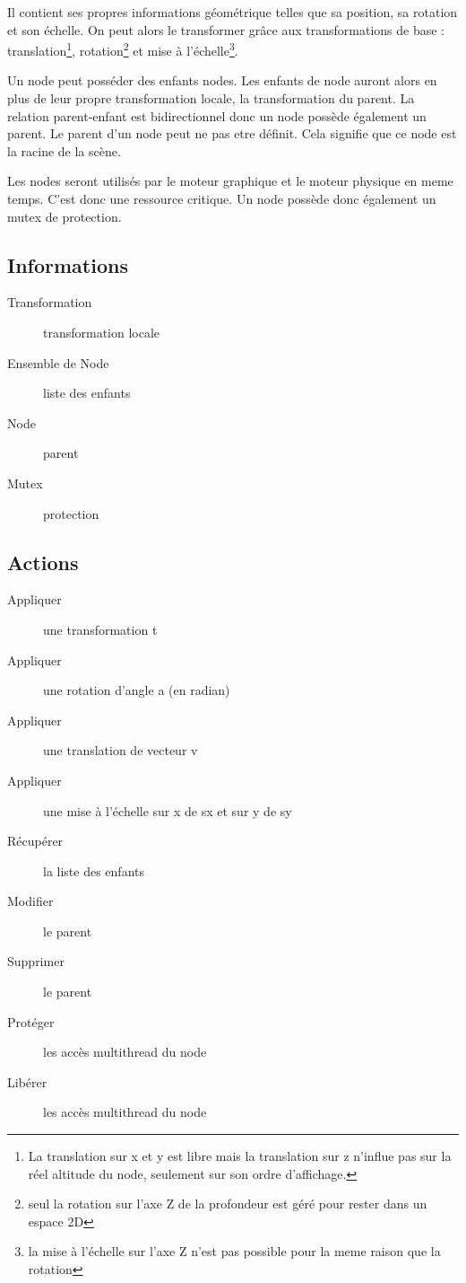 \documentclass[11pt, a4paper]{article}
\begin{document}
Il contient ses propres informations géométrique telles que sa position, sa rotation et son échelle.
On peut alors le transformer grâce aux transformations de base :
 translation\footnote{La translation sur x et y est libre mais la translation sur z n'influe pas sur la réel altitude du node, seulement sur son ordre d'affichage.},
 rotation\footnote{seul la rotation sur l'axe Z de la profondeur est géré pour rester dans un espace 2D}
et mise à l'échelle\footnote{la mise à l'échelle sur l'axe Z n'est pas possible pour la meme raison que la rotation}.

Un node peut posséder des enfants nodes. Les enfants de node auront alors en plus de leur propre transformation locale, la transformation du parent. La relation parent-enfant est bidirectionnel donc un node possède également un parent. Le parent d'un node peut ne pas etre définit. Cela signifie que ce node est la racine de la scène.

Les nodes seront utilisés par le moteur graphique et le moteur physique en meme temps. C'est donc une ressource critique. Un node possède donc également un mutex de protection.

\subsection{Informations}
\begin{description}
\item[Transformation] transformation locale
\item[Ensemble de Node] liste des enfants
\item[Node] parent
\item[Mutex] protection
\end{description}

\subsection{Actions}
\begin{description}
\item[Appliquer] une transformation t
\item[Appliquer] une rotation d'angle a (en radian)
\item[Appliquer] une translation de vecteur v
\item[Appliquer] une mise à l'échelle sur x de sx et sur y de sy
\item[Récupérer] la liste des enfants
\item[Modifier] le parent
\item[Supprimer] le parent
\item[Protéger] les accès multithread du node
\item[Libérer] les accès multithread du node
\end{description}
\end{document}
